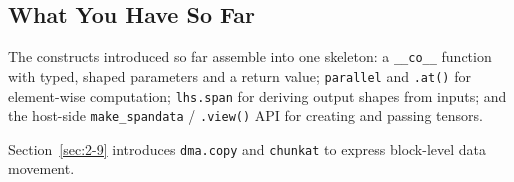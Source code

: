 \subsection*{What You Have So Far}

The constructs introduced so far assemble into one skeleton: a \texttt{\_\_co\_\_} function with typed, shaped parameters and a return value; \texttt{parallel} and \texttt{.at()} for element-wise computation; \texttt{lhs.span} for deriving output shapes from inputs; and the host-side \texttt{make\_spandata} / \texttt{.view()} API for creating and passing tensors.

Section~\ref{sec:2-9} introduces \texttt{dma.copy} and \texttt{chunkat} to express block-level data movement.
